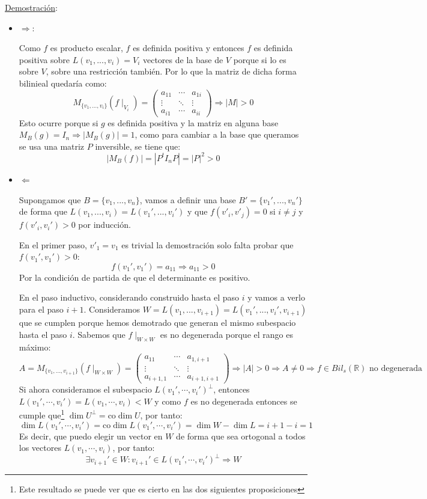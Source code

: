 \documentclass[10pt,a4paper,openright]{book}
\begin{document}
\underline{Demostración}:
\begin{itemize}
\item $\Rightarrow $:

Como $f$ es producto escalar, $f$ es definida positiva y entonces $f$ es definida positiva sobre $L(v_1, ..., v_i) = V_i$ vectores de la base de $V$ porque si lo es sobre $V$, sobre una restricción también. Por lo que la matriz de dicha forma bilinieal quedaría como:
$$M_{\{v_1, ..., v_i\}}(f\mid_{V_i})=\begin{pmatrix} a_{11} & \cdots & a_{1i} \\ \vdots & \ddots & \vdots \\ a_{i1} & \cdots & a_{ii}\end{pmatrix} \Rightarrow |M| > 0$$
Esto ocurre porque si $g$ es definida positiva y la matriz en alguna base $M_B(g) = I_n\Rightarrow |M_B(g)|=1$, como para cambiar a la base que queramos se usa una matriz $P$ inversible, se tiene que:
$$|M_B(f)|=|P^tI_nP|=|P|^2 > 0$$

\item $\Leftarrow$

Supongamos que $B=\{v_1, ..., v_n\}$, vamos a definir una base $B'=\{v_1', ..., v_n'\}$ de forma que $L(v_1, ..., v_i) = L(v_1', ..., v_i')$ y que $f(v'_i, v'_j)=0$ si $i\neq j$ y $f(v'_i, v_i')>0$ por inducción.

En el primer paso, $v'_1=v_1$ es trivial la demostración solo falta probar que $f(v_1', v_1')>0$:
$$f(v_1', v_1') = a_{11}\Rightarrow a_{11}>0$$
Por la condición de partida de que el determinante es positivo.

En el paso inductivo, considerando construido hasta el paso $i$ y vamos a verlo para el paso $i+1$. Consideramos $W=L(v_1, ..., v_{i+1}) = L(v_1', ..., v_i', v_{i+1})$ que se cumplen porque hemos demotrado que generan el mismo subespacio hasta el paso $i$. Sabemos que $f\mid_{W\times W}$ es no degenerada porque el rango es máximo:
$$A = M_{\{v_1, ..., v_{i+1}\}}(f\mid_{W\times W}) = \begin{pmatrix} a_{11} & \cdots & a_{1,i+1} \\ \vdots & \ddots & \vdots \\ a_{i+1,1} & \cdots & a_{i+1,i+1}\end{pmatrix}\Rightarrow |A| > 0 \Rightarrow A\neq 0\Rightarrow f\in Bil_s(\mathbb R)\mbox{ no degenerada}$$
Si ahora consideramos el subespacio $L(v_1', \cdots, v_i')^\perp$, entonces $L(v_1', \cdots , v_i') = L(v_1, \cdots, v_i)<W$ y como $f$ es no degenerada entonces se cumple que\footnote{Este resultado se puede ver que es cierto en las dos siguientes proposiciones} $\dim U^\perp = \mbox{co}\dim U$, por tanto:
$$\dim L(v_1', \cdots, v_i') = \mbox{co}\dim L(v_1', \cdots, v_i') = \dim W - \dim L = i+1-i = 1$$
Es decir, que puedo elegir un vector en $W$ de forma que sea ortogonal a todos los vectores $L(v_1, \cdots, v_i)$, por tanto:
$$\exists v_{i+1}'\in W: v_{i+1}'\in L(v_1', \cdots, v_i')^\perp\Rightarrow W$$


\end{itemize}
\end{document}
